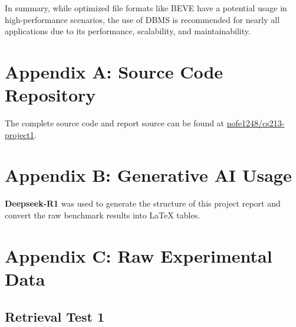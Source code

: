\documentclass[14pt,a4paper]{article}
\begin{document}
    In summary, while optimized file formats like BEVE have a potential usage in high-performance scenarios, the use of DBMS is recommended for nearly all applications due to its performance, scalability, and maintainability.
    
    \appendix
    \section{Appendix A: Source Code Repository}
    The complete source code and report source can be found at \href{https://github.com/nofe1248/cs213-project1}{nofe1248/cs213-project1}.
    
    \section{Appendix B: Generative AI Usage}
    \textbf{Deepseek-R1} was used to generate the structure of this project report and convert the raw benchmark results into LaTeX tables.
    
    \section{Appendix C: Raw Experimental Data}
    \subsection{Retrieval Test 1}
    
\end{document}
